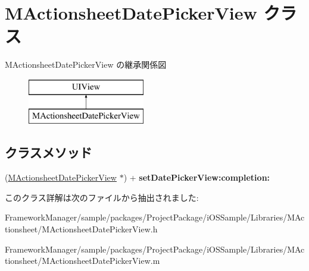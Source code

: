 \hypertarget{interface_m_actionsheet_date_picker_view}{}\section{M\+Actionsheet\+Date\+Picker\+View クラス}
\label{interface_m_actionsheet_date_picker_view}
M\+Actionsheet\+Date\+Picker\+View の継承関係図\begin{figure}[H]
\begin{center}
\leavevmode
\includegraphics[height=2.000000cm]{interface_m_actionsheet_date_picker_view}
\end{center}
\end{figure}
\subsection*{クラスメソッド}
\begin{DoxyCompactItemize}
\item 
\hypertarget{interface_m_actionsheet_date_picker_view_ab06d7d3be615773ff711adff934f81ee}{}(\hyperlink{interface_m_actionsheet_date_picker_view}{M\+Actionsheet\+Date\+Picker\+View} $\ast$) + {\bfseries set\+Date\+Picker\+View\+:completion\+:}\label{interface_m_actionsheet_date_picker_view_ab06d7d3be615773ff711adff934f81ee}

\end{DoxyCompactItemize}


このクラス詳解は次のファイルから抽出されました\+:\begin{DoxyCompactItemize}
\item 
Framework\+Manager/sample/packages/\+Project\+Package/i\+O\+S\+Sample/\+Libraries/\+M\+Actionsheet/M\+Actionsheet\+Date\+Picker\+View.\+h\item 
Framework\+Manager/sample/packages/\+Project\+Package/i\+O\+S\+Sample/\+Libraries/\+M\+Actionsheet/M\+Actionsheet\+Date\+Picker\+View.\+m\end{DoxyCompactItemize}
